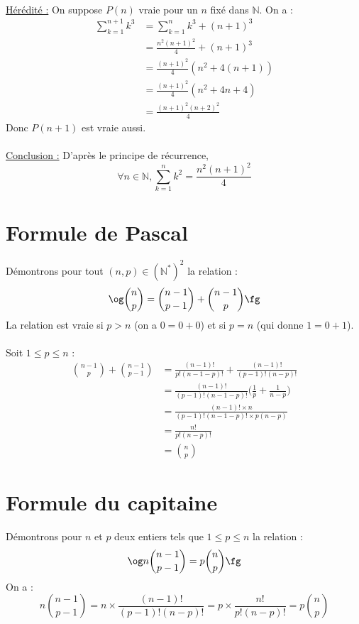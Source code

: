 \documentclass[../main.tex]{subfiles}
\begin{document}
\begin{itemize}
    \\
    \underline{Hérédité :} On suppose $P(n)$ vraie pour un $n$ fixé dans
    $\mathbb N$. On a :
    \begin{align*}
    \sum_{k=1}^{n+1}k^3 & = \sum_{k=1}^{n}k^3 + (n+1)^3 \\
    & = \frac{n^2(n+1)^2}{4} + (n+1)^3 \\
    & = \frac{(n+1)^2}{4}(n^2 + 4(n+1)) \\
    & = \frac{(n+1)^2}{4}(n^2 + 4n + 4) \\
    & = \frac{(n+1)^2(n+2)^2}{4}
    \end{align*}
    Donc $P(n+1)$ est vraie aussi.\\
    \\
    \underline{Conclusion :} D'après le principe de récurrence,
    $$\forall n \in \mathbb{N}, \sum_{k=1}^{n}k^2=\frac{n^2(n+1)^2}{4}$$
\end{itemize}

\setcounter{section}{38}
\section{Formule de Pascal}
Démontrons pour tout $(n,p)\in(\mathbb{N}^*)^2$ la relation :
$$\text\og\binom{n}{p}=\binom{n-1}{p-1}+\binom{n-1}{p}\text\fg$$
La relation est vraie si $p>n$ (on a $0 = 0+0$) et si $p=n$ (qui
donne $1=0+1$).\\
\\
Soit $1\le p\le n$ :
\begin{align*}
  \binom{n-1}{p}+\binom{n-1}{p-1} & = \frac{(n-1)!}{p!(n-1-p)!} +
  \frac{(n-1)!}{(p-1)!(n-p)!} \\[8pt]
  & = \frac{(n-1)!}{(p-1)!(n-1-p)!}\bigg(\frac 1 p + \frac{1}{n-p}\bigg) \\[8pt]
  & = \frac{(n-1)!\times n}{(p-1)!(n-1-p)!\times p(n-p)} \\[8pt]
  & = \frac{n!}{p!(n-p)!} \\[8pt]
  & = \binom{n}{p}
\end{align*}

\setcounter{section}{40}
\section{Formule du capitaine}
Démontrons pour $n$ et $p$ deux entiers tels que $1\le p\le n$ la relation :
$$\text\og n\binom{n-1}{p-1}=p\binom{n}{p}\text\fg$$
On a :
$$n\binom{n-1}{p-1}=n\times\frac{(n-1)!}{(p-1)!(n-p)!}=p\times\frac{n!}{p!(n-p)!}=p\binom{n}{p}$$
\end{document}
